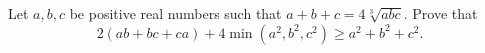 Let $a,b,c$ be positive real numbers such that $a+b+c=4\sqrt[3]{abc}$. Prove that \[2\left(ab+bc+ca\right)+4\min\left(a^2,b^2,c^2\right)\geq a^2+b^2+c^2.\]